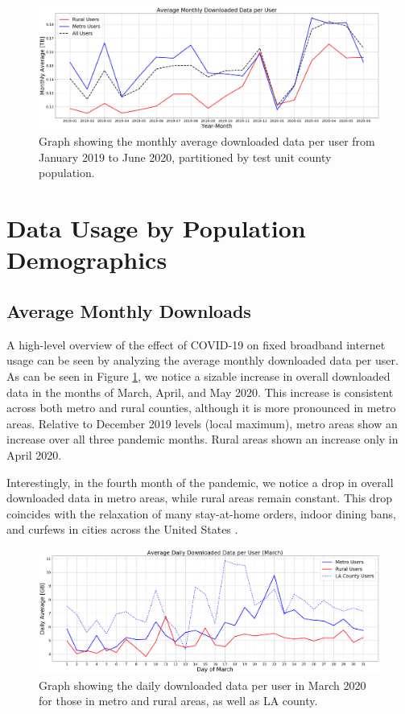 \begin{figure}
    \centering
    \includegraphics[width=1.0\linewidth]{figs/monthly_downloaded_data.png}
    \caption{Graph showing the monthly average downloaded data per user from January 2019 to June 2020, partitioned by test unit county population.}
    \label{fig:downloadmetro_rural}
\end{figure}

\section{Data Usage by Population Demographics}

\subsection{Average Monthly Downloads}

A high-level overview of the effect of COVID-19 on fixed broadband internet usage can be seen by analyzing the average monthly downloaded data per user. As can be seen in Figure \ref{fig:downloadmetro_rural}, we notice a sizable increase in overall downloaded data in the months of March, April, and May 2020. This increase is consistent across both metro and rural counties, although it is more pronounced in metro areas. Relative to December 2019 levels (local maximum), metro areas show an increase over all three pandemic months. Rural areas shown an increase only in April 2020.

Interestingly, in the fourth month of the pandemic, we notice a drop in overall downloaded data in metro areas, while rural areas remain constant. This drop coincides with the relaxation of many stay-at-home orders, indoor dining bans, and curfews in cities across the United States \cite{money2020la,gov2020nyc}. 

\begin{figure}
    \centering
    \includegraphics[width=1.0\linewidth]{figs/daily_downloaded_data.png}
    \caption{Graph showing the daily downloaded data per user in March 2020 for those in metro and rural areas, as well as LA county.}
    \label{fig:dailymetro_rural}
\end{figure}

